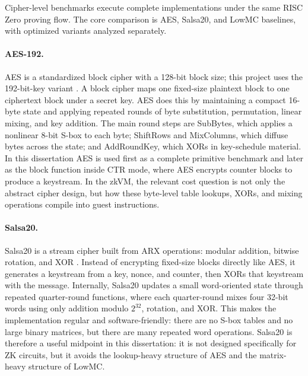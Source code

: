 Cipher-level benchmarks execute complete implementations under the same RISC Zero
proving flow. The core comparison is AES, Salsa20, and LowMC baselines, with
optimized variants analyzed separately.

\paragraph{AES-192.}
AES is a standardized block cipher with a 128-bit block size; this project uses
the 192-bit-key variant \cite{nistfips197,daemen2002rijndael}. A block cipher
maps one fixed-size plaintext block to one ciphertext block under a secret key.
AES does this by maintaining a compact 16-byte state and applying repeated
rounds of byte substitution, permutation, linear mixing, and key addition. The
main round steps are SubBytes, which applies a nonlinear 8-bit S-box to each
byte; ShiftRows and MixColumns, which diffuse bytes across the state; and
AddRoundKey, which XORs in key-schedule material. In this dissertation AES is
used first as a complete primitive benchmark and later as the block function
inside CTR mode, where AES encrypts counter blocks to produce a keystream. In
the zkVM, the relevant cost question is not only the abstract cipher design, but
how these byte-level table lookups, XORs, and mixing operations compile into
guest instructions.

\paragraph{Salsa20.}
Salsa20 is a stream cipher built from ARX operations: modular addition, bitwise
rotation, and XOR \cite{bernstein2008salsa20}. Instead of encrypting fixed-size
blocks directly like AES, it generates a keystream from a key, nonce, and counter,
then XORs that keystream with the message. Internally, Salsa20 updates a small
word-oriented state through repeated quarter-round functions, where each
quarter-round mixes four 32-bit words using only addition modulo \(2^{32}\),
rotation, and XOR. This makes the implementation regular and software-friendly:
there are no S-box tables and no large binary matrices, but there are many
repeated word operations. Salsa20 is therefore a useful midpoint in this
dissertation: it is not designed specifically for ZK circuits, but it avoids the
lookup-heavy structure of AES and the matrix-heavy structure of LowMC.

